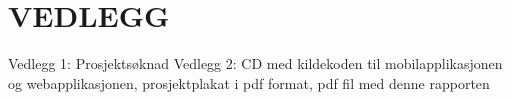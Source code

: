 \documentclass[../main.tex]{subfiles}
\begin{document}
\appendix

\section{VEDLEGG}

Vedlegg 1: Prosjektsøknad\newline
\newline
Vedlegg 2: CD med kildekoden til mobilapplikasjonen og webapplikasjonen, prosjektplakat i pdf format, pdf fil med denne rapporten
\end{document}

